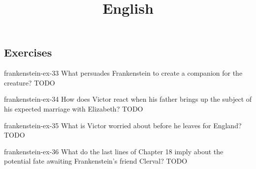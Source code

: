 \documentclass[preview]{standalone}
\begin{document}
\title{English}
\genpage

\subsection{Exercises}

\begin{snippetexercise}{frankenstein-ex-33}
    {What persuades Frankenstein to create a companion for the creature?}
    TODO 
\end{snippetexercise}

\begin{snippetexercise}{frankenstein-ex-34}
    {How does Victor react when his father brings up the subject of his expected marriage with
    Elizabeth?}
    TODO 
\end{snippetexercise}

\begin{snippetexercise}{frankenstein-ex-35}
    {What is Victor worried about before he leaves for England?}
    TODO 
\end{snippetexercise}

\begin{snippetexercise}{frankenstein-ex-36}
    {What do the last lines of Chapter 18 imply about the potential fate awaiting Frankenstein’s friend
    Clerval?}
    TODO 
\end{snippetexercise}
\end{document}
